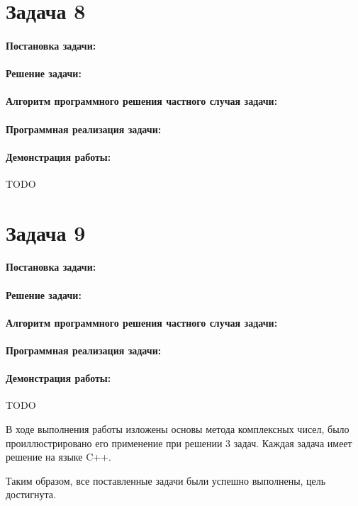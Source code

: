{
   \section*{Задача 8}
   \paragraph{Постановка задачи:}
   \paragraph{Решение задачи:}
   \paragraph{Алгоритм программного решения частного случая задачи:}
   \paragraph{Программная реализация задачи:}
   \paragraph{Демонстрация работы:}
   TODO %
}{
   \section*{Задача 9}
   \paragraph{Постановка задачи:}
   \paragraph{Решение задачи:}
   \paragraph{Алгоритм программного решения частного случая задачи:}
   \paragraph{Программная реализация задачи:}
   \paragraph{Демонстрация работы:}
   TODO %
}
В ходе выполнения работы изложены основы метода комплексных чисел, было проиллюстрировано его
применение при решении 3 задач. Каждая задача имеет решение на языке C++.


Таким образом, все поставленные задачи были успешно выполнены, цель
достигнута.




